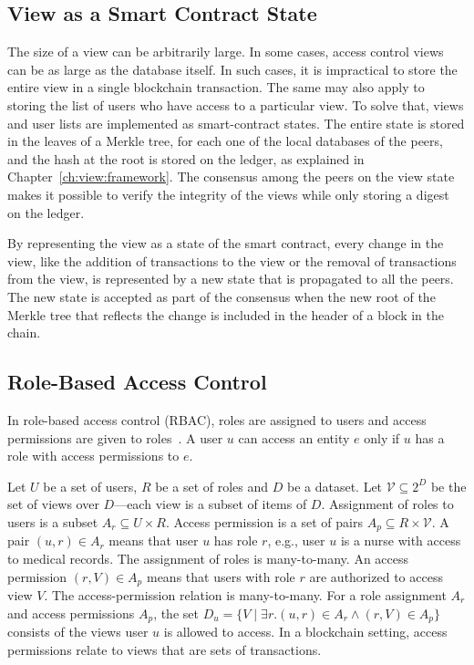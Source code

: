 \subsection{View as a Smart Contract State}
\label{ch:view:ac_views:view_as_contract}
The size of a view can be arbitrarily large. In some cases, access control views can be as large as the database itself. In such cases, it is impractical to store the entire view in a single blockchain transaction. The same may also apply to storing the list of users who have access to a particular view. To solve that, views and user lists are implemented as smart-contract states. The entire state is stored in the leaves of a Merkle tree, for each one of the local databases of the peers, and the hash at the root is stored on the ledger, as explained in Chapter~\ref{ch:view:framework}. The consensus among the peers on the view state makes it possible to verify the integrity of the views while only storing a digest on the ledger.

By representing the view as a state of the smart contract, every change in the view, like the addition of transactions to the view or the removal of transactions from the view, is represented by a new state that is propagated to all the peers. The new state is accepted as part of the consensus when the new root of the Merkle tree that reflects the change is included in the header of a block in the chain.   

\subsection{Role-Based Access Control}
\label{ch:view:ac_views:rbac}

In role-based access control (RBAC), roles are assigned to users and access permissions are given to roles~\cite{sandhu1998role,ferraiolo2003role}. A user $u$ can access an entity $e$ only if $u$ has a role with access permissions to $e$. 

Let $U$ be a set of users, $R$ be a set of roles and $D$ be a dataset. Let $\mathcal{V} \subseteq 2^D$ 
be the set of views over $D$---each view is a subset of items of $D$. Assignment of roles to users is a subset $A_r \subseteq U\times R$. Access permission is a set of pairs $A_p \subseteq R\times \mathcal{V}$. A pair $(u, r)\in A_r$ means that user $u$ has role $r$, e.g., user $u$ is a nurse with access to medical records. The assignment of roles is many-to-many.
An access permission $(r, V)\in A_p$ means that users with role $r$ are authorized to access view $V$. The access-permission relation is many-to-many.
For a role assignment $A_r$ and access permissions $A_p$, 
the set $D_u = \{V\mid \exists r . (u,r)\in A_r \wedge (r,V)\in A_p\}$
consists of the views user $u$ is allowed to access. 
In a blockchain setting, access permissions relate to views that are sets of transactions.

